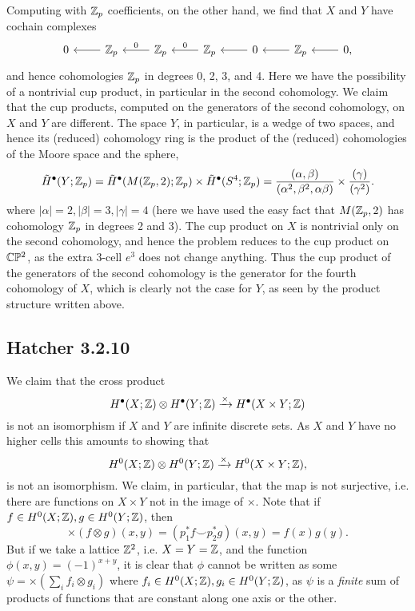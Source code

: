 \documentclass{../mathnotes}
\begin{document}
Computing with $\mathbb{Z}_p$ coefficients, on the other hand, we find that $X$ and $Y$ have
cochain complexes
\begin{equation*}
    \begin{tikzcd}
        0 & \Z_p\ar{l} & \Z_p\ar[swap]{l}{0} & \Z_p\ar[swap]{l}{0}& 0\ar{l}& \Z_p\ar{l} & 0\ar{l},
    \end{tikzcd}
\end{equation*}
and hence cohomologies $\mathbb{Z}_p$ in degrees 0, 2, 3, and 4. Here we have the possibility of a
nontrivial cup product, in particular in the second cohomology. We claim that the cup products,
computed on the generators of the second cohomology, on $X$ and $Y$ are different. The space $Y$,
in particular, is a wedge of two spaces, and hence its (reduced) cohomology ring is the product
of the (reduced) cohomologies of the Moore space and the sphere,
\[\tilde H^\bullet(Y;\mathbb{Z}_p)=\tilde H^\bullet(M(\mathbb{Z}_p,2);\mathbb{Z}_p)\times \tilde H^\bullet(S^4;\mathbb{Z}_p)=\frac{(\alpha,\beta)}{(\alpha^2,\beta^2,\alpha\beta)}\times \frac{(\gamma)}{(\gamma^2)}.\]
where $|\alpha|=2,|\beta|=3,|\gamma|=4$ (here we have used the easy fact that $M(\mathbb{Z}_p,2)$
has cohomology $\mathbb{Z}_p$ in degrees 2 and 3). The cup product on $X$ is nontrivial only
on the second cohomology, and hence the problem reduces to the cup product on $\mathbb{C}\mathbb{P}^2$, as
the extra 3-cell $e^3$ does not change anything. Thus the cup product of the generators
of the second cohomology is the generator for the fourth cohomology of $X$, which is clearly
not the case for $Y$, as seen by the product structure written above.

\subsection*{Hatcher 3.2.10}
We claim that the cross product 
\[H^\bullet(X;\mathbb{Z})\otimes H^\bullet(Y;\mathbb{Z})\xrightarrow{\times} H^\bullet(X\times Y;\mathbb{Z})\]
is not an isomorphism if $X$ and $Y$ are infinite discrete sets. As $X$ and $Y$
have no higher cells this amounts to showing that
\[H^0(X;\mathbb{Z})\otimes H^0(Y;\mathbb{Z})\xrightarrow{\times} H^0(X\times Y;\mathbb{Z}),\]
is not an isomorphism. We claim, in particular, that the map is not surjective,
i.e. there are functions on $X\times Y$ not in the image of $\times$. Note that
if $f\in H^0(X;\mathbb{Z}), g\in H^0(Y;\mathbb{Z})$, then
\[\times(f\otimes g)(x,y)=(p_1^*f\smile p_2^*g)(x,y)=f(x)g(y).\]
But if we take a lattice $\mathbb{Z}^2$, i.e. $X=Y=\mathbb{Z}$, and the function $\phi(x,y)=(-1)^{x+y}$,
it is clear that $\phi$ cannot be written as some $\psi=\times\left( \sum_i f_i\otimes g_i\right)$ where
$f_i\in H^0(X;\mathbb{Z}),g_i\in H^0(Y;\mathbb{Z})$, as $\psi$ is a \textit{finite} sum of products of functions
that are constant along one axis or the other.
\end{document}
